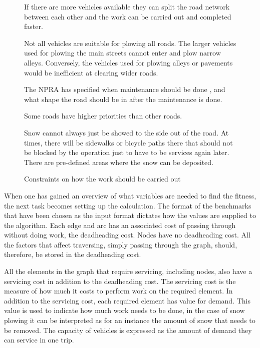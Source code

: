 \begin{figure}[thbp]
\caption{Constraints on how the work should be carried out}
\label{fig:imposed_constraints}
\begin{description}
    \item [Equipment -- Amount of vehicles available.] If there are more vehicles available they can split the road network between each other and the work can be carried out and completed faster.
    \item [Equipment -- Types of vehicles available.] Not all vehicles are suitable for plowing all roads. The larger vehicles used for plowing the main streets cannot enter and plow narrow alleys. Conversely, the vehicles used for plowing alleys or pavements would be inefficient at clearing wider roads.
    \item [The weather.] The NPRA has specified when maintenance should be done \citep{svvR610}, and what shape the road should be in after the maintenance is done.
    \item [The type of road.] Some roads have higher priorities than other roads.
    \item [Where the snow can be stored.] Snow cannot always just be showed to the side out of the road. At times, there will be sidewalks or bicycle paths there that should not be blocked by the operation just to have to be services again later. There are pre-defined areas where the snow can be deposited.
\end{description}
\end{figure}


When one has gained an overview of what variables are needed to find the fitness, the next task becomes setting up the calculation. The format of the benchmarks that have been chosen as the input format dictates how the values are supplied to the algorithm. Each edge and arc has an associated cost of passing through without doing work, the deadheading cost. Nodes have no deadheading cost. All the factors that affect traversing, simply passing through the graph, should, therefore, be stored in the deadheading cost.

All the elements in the graph that require servicing, including nodes, also have a servicing cost in addition to the deadheading cost. The servicing cost is the measure of how much it costs to perform work on the required element. In addition to the servicing cost, each required element has value for demand. This value is used to indicate how much work needs to be done, in the case of snow plowing it can be interpreted as for an instance the amount of snow that needs to be removed. The capacity of vehicles is expressed as the amount of demand they can service in one trip.

